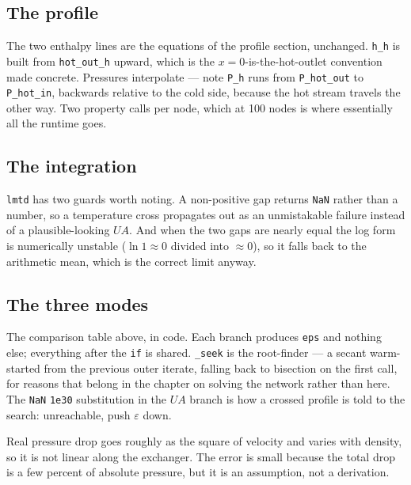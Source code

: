 \documentclass[11pt,a4paper]{report}
\newcommand{\code}[1]{\texttt{\small #1}}
\begin{document}
\subsection{The profile}


\noindent The two enthalpy lines are the equations of the profile section,
unchanged. \code{h\_h} is built from \code{hot\_out\_h} upward, which is the
$x=0$-is-the-hot-outlet convention made concrete. Pressures interpolate ---
note \code{P\_h} runs from \code{P\_hot\_out} to \code{P\_hot\_in}, backwards
relative to the cold side, because the hot stream travels the other way. Two
property calls per node, which at \num{100} nodes is where essentially all
the runtime goes.

\subsection{The integration}


\noindent \code{lmtd} has two guards worth noting. A non-positive gap
returns \code{NaN} rather than a number, so a temperature cross propagates
out as an unmistakable failure instead of a plausible-looking $UA$. And when
the two gaps are nearly equal the log form is numerically unstable
($\ln 1 \approx 0$ divided into $\approx 0$), so it falls back to the
arithmetic mean, which is the correct limit anyway.

\subsection{The three modes}


\noindent The comparison table above, in code. Each branch produces
\code{eps} and nothing else; everything after the \code{if} is shared.
\code{\_seek} is the root-finder --- a secant warm-started from the previous
outer iterate, falling back to bisection on the first call, for reasons that
belong in the chapter on solving the network rather than here. The
\code{NaN}\,\textrightarrow\,\code{1e30} substitution in the $UA$ branch is
how a crossed profile is told to the search: unreachable, push
$\varepsilon$ down.

\begin{caveat}[title={Caveat: the pressure interpolation is linear and that is a guess}]
Real pressure drop goes roughly as the square of velocity and varies with
density, so it is not linear along the exchanger. The error is small
because the total drop is a few percent of absolute pressure, but it is an
assumption, not a derivation.
\end{caveat}
\end{document}
